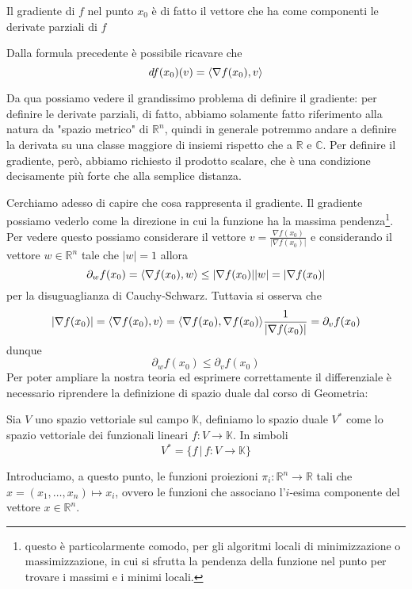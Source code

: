\begin{remark}
Il gradiente di $f$ nel punto $x_0$ è di fatto il vettore che ha come componenti le derivate parziali di $f$
\end{remark}
\noindent Dalla formula precedente è possibile ricavare che
$$
df(x_0)(v) = \langle \nabla{f(x_0)}, v \rangle
$$
\begin{remark}
Da qua possiamo vedere il grandissimo problema di definire il gradiente: per definire le derivate parziali, di fatto, abbiamo solamente fatto riferimento alla natura da "spazio metrico" di $\mathbb{R}^n$, quindi in generale potremmo andare a definire la derivata su una classe maggiore di insiemi rispetto che a $\mathbb{R}$ e $\mathbb{C}$. Per definire il gradiente, però, abbiamo richiesto il prodotto scalare, che è una condizione decisamente più forte che alla semplice distanza.
\end{remark}
\noindent Cerchiamo adesso di capire che cosa rappresenta il gradiente. Il gradiente possiamo vederlo come la direzione in cui la funzione ha la massima pendenza\footnote{questo è particolarmente comodo, per gli algoritmi locali di minimizzazione o massimizzazione, in cui si sfrutta la pendenza della funzione nel punto per trovare i massimi e i minimi locali.}. Per vedere questo possiamo considerare il vettore $v = \frac{\nabla f(x_0)}{|\nabla f(x_0)|}$ e considerando il vettore $w \in \mathbb{R}^n$ tale che $|w| = 1$ allora
$$
\partial_w f(x_0) = \langle \nabla{f(x_0)}, w \rangle \leq |\nabla{f(x_0)}||w| = |\nabla{f(x_0)}|
$$
per la disuguaglianza di Cauchy-Schwarz. Tuttavia si osserva che
$$
|\nabla{f(x_0)}| = \langle \nabla{f(x_0)}, v \rangle = \langle \nabla{f(x_0)}, \nabla{f(x_0)} \rangle \frac{1}{|\nabla{f(x_0)}|} = \partial_v f(x_0)
$$
dunque
$$
\partial_w f(x_0) \leq \partial_v f(x_0)
$$
Per poter ampliare la nostra teoria ed esprimere correttamente il differenziale è necessario riprendere la definizione di spazio duale dal corso di Geometria:
\begin{definition}
Sia $V$ uno spazio vettoriale sul campo $\mathbb{K}$, definiamo lo spazio duale $V^{*}$ come lo spazio vettoriale dei funzionali lineari $f: V \to \mathbb{K}$. In simboli
$$
V^{*} = \{f \, | \, f: V \to \mathbb{K} \}
$$
\end{definition}
\noindent Introduciamo, a questo punto, le funzioni proiezioni $\pi_i: \mathbb{R}^n \to \mathbb{R}$ tali che $x = (x_1, \ldots, x_n) \mapsto x_i$, ovvero le funzioni che associano l'$i$-esima componente del vettore $x \in \mathbb{R}^n$. \\
